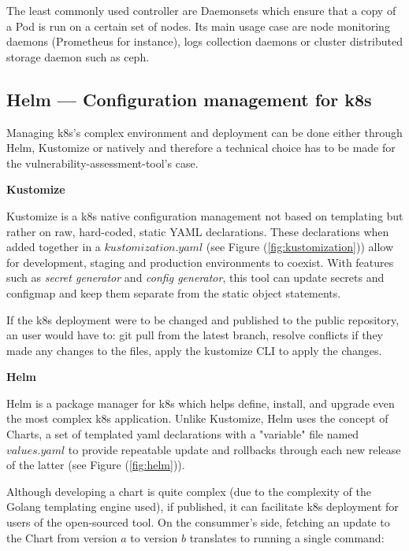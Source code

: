 \documentclass[11pt]{article}
\begin{document}

\vspace{-5mm} The least commonly used controller are Daemonsets which ensure that a copy of a Pod is run on a certain set of nodes. Its main usage case are node monitoring daemons (Prometheus for instance), logs collection daemons or cluster distributed storage daemon such as ceph.

\subsection{Helm — Configuration management for k8s}

\hspace{5mm} Managing k8s's complex environment and deployment can be done either through Helm, Kustomize or natively and therefore a technical choice has to be made for the vulnerability-assessment-tool's case. 

\textbf{Kustomize}

Kustomize is a k8s native configuration management not based on templating but rather on raw, hard-coded, static YAML declarations. These declarations when added together in a $kustomization.yaml$ (see Figure (\ref{fig:kustomization})) allow for development, staging and production environments to coexist. With features such as \textit{secret generator} and \textit{config generator}, this tool can update secrets and configmap and keep them separate from the static object statements. 

If the k8s deployment were to be changed and published to the public repository, an user would have to: git pull from the latest branch, resolve conflicts if they made any changes to the files, apply the kustomize CLI to apply the changes.

\textbf{Helm}

Helm is a package manager for k8s which helps define, install, and upgrade even the most complex k8s application. Unlike Kustomize, Helm uses the concept of Charts, a set of templated yaml declarations with a "variable" file named $values.yaml$ to provide repeatable update and rollbacks through each new release of the latter (see Figure (\ref{fig:helm})). 

Although developing a chart is quite complex (due to the complexity of the Golang templating engine used), if published, it can facilitate k8s deployment for users of the open-sourced tool. On the consummer's side, fetching an update to the Chart from version $a$ to version $b$ translates to running a single command: 
\end{document}
